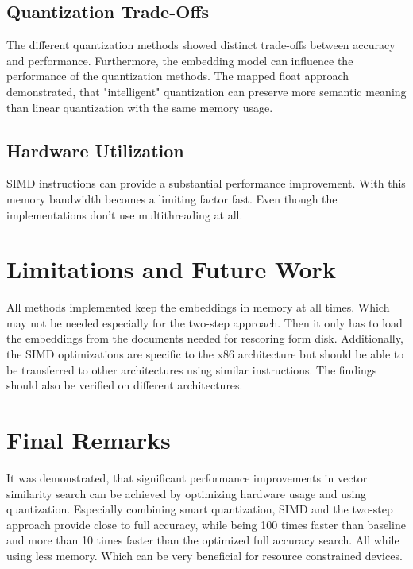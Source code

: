 \subsection{Quantization Trade-Offs}
The different quantization methods showed distinct trade-offs between accuracy and performance. Furthermore, the embedding model can influence the performance of the quantization methods. The mapped float approach demonstrated, that "intelligent" quantization can preserve more semantic meaning than linear quantization with the same memory usage.

\subsection{Hardware Utilization}
SIMD instructions can provide a substantial performance improvement. With this memory bandwidth becomes a limiting factor fast. Even though the implementations don't use multithreading at all.

\section{Limitations and Future Work}
All methods implemented keep the embeddings in memory at all times. Which may not be needed especially for the two-step approach. Then it only has to load the embeddings from the documents needed for rescoring form disk. Additionally, the SIMD optimizations are specific to the x86 architecture but should be able to be transferred to other architectures using similar instructions. The findings should also be verified on different architectures.

\section{Final Remarks}
It was demonstrated, that significant performance improvements in vector similarity search can be achieved by optimizing hardware usage and using quantization. Especially combining smart quantization, SIMD and the two-step approach provide close to full accuracy, while being 100 times faster than baseline and more than 10 times faster than the optimized full accuracy search. All while using less memory. Which can be very beneficial for resource constrained devices.